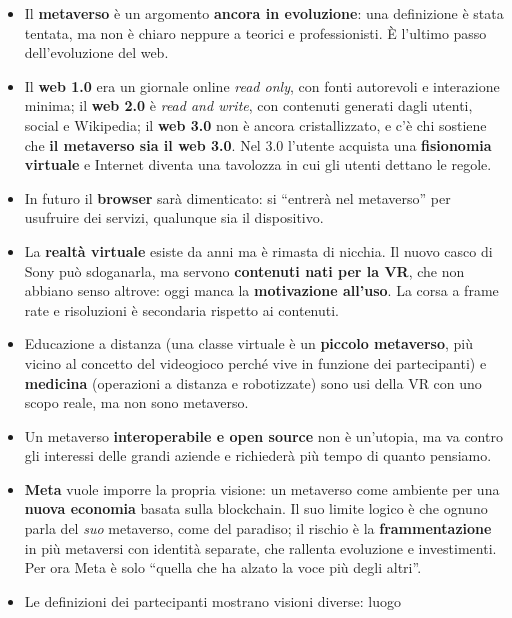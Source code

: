 \begin{itemize}
  \item Il \textbf{metaverso} è un argomento \textbf{ancora in evoluzione}: una
        definizione è stata tentata, ma non è chiaro neppure a teorici e
        professionisti. È l'ultimo passo dell'evoluzione del web.
  \item Il \textbf{web 1.0} era un giornale online \emph{read only}, con fonti
        autorevoli e interazione minima; il \textbf{web 2.0} è \emph{read and
        write}, con contenuti generati dagli utenti, social e Wikipedia; il
        \textbf{web 3.0} non è ancora cristallizzato, e c'è chi sostiene che
        \textbf{il metaverso sia il web 3.0}. Nel 3.0 l'utente acquista una
        \textbf{fisionomia virtuale} e Internet diventa una tavolozza in cui gli
        utenti dettano le regole.
  \item In futuro il \textbf{browser} sarà dimenticato: si ``entrerà nel
        metaverso'' per usufruire dei servizi, qualunque sia il dispositivo.
  \item La \textbf{realtà virtuale} esiste da anni ma è rimasta di nicchia. Il
        nuovo casco di Sony può sdoganarla, ma servono \textbf{contenuti nati per
        la VR}, che non abbiano senso altrove: oggi manca la \textbf{motivazione
        all'uso}. La corsa a frame rate e risoluzioni è secondaria rispetto ai
        contenuti.
  \item Educazione a distanza (una classe virtuale è un \textbf{piccolo
        metaverso}, più vicino al concetto del videogioco perché vive in funzione
        dei partecipanti) e \textbf{medicina} (operazioni a distanza e
        robotizzate) sono usi della VR con uno scopo reale, ma non sono
        metaverso.
  \item Un metaverso \textbf{interoperabile e open source} non è un'utopia, ma va
        contro gli interessi delle grandi aziende e richiederà più tempo di
        quanto pensiamo.
  \item \textbf{Meta} vuole imporre la propria visione: un metaverso come
        ambiente per una \textbf{nuova economia} basata sulla blockchain. Il suo
        limite logico è che ognuno parla del \emph{suo} metaverso, come del
        paradiso; il rischio è la \textbf{frammentazione} in più metaversi con
        identità separate, che rallenta evoluzione e investimenti. Per ora
        Meta è solo ``quella che ha alzato la voce più degli altri''.
  \item Le definizioni dei partecipanti mostrano visioni diverse: luogo

\end{itemize}
